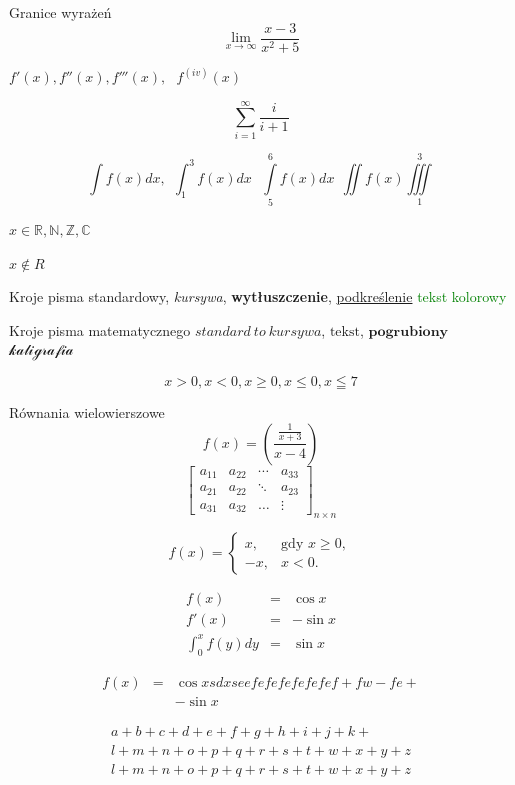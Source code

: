 {Granice wyrażeń
$$
\lim\limits_{x\rightarrow \infty} \frac{x-3}{x^2+5}
$$

$f'(x), f''(x), f'''(x),\ \ \  f^{(iv)}(x)$

$$
\sum_{i=1}^{\infty} \frac{i}{i+1}
$$

$$
\int f(x) dx ,\ \ \int_{1}^{3} f(x) dx \ \ \ \int\limits_5^6 f(x) dx \ \ 
\iint f(x) \iiint\limits_{1}^3
$$

$x\in \mathbb{R, N, Z, C}$ 

$x\notin R$

Kroje pisma standardowy, \textit{kursywa}, \textbf{wytłuszczenie}, \underline{podkreślenie} \textcolor{green}{tekst kolorowy}

Kroje pisma matematycznego $standard\ to\ kursywa $, $\mathrm{tekst}$, $\mathbf{pogrubiony}$  $\mathcal{kaligrafia}$

$$
x>0, x<0, x\geq 0, x\le 0, x\leqq 7
$$

Równania wielowierszowe
\begin{equation*}
	f(x)=\left(\frac{\frac{1}{x+3}}{x-4}\right)
\end{equation*}
$$
\left[
\begin{array}{cccc}
	a_{11} & a_{22} & \cdots & a_{33} \\
	a_{21} & a_{22} & \ddots & a_{23} \\
	a_{31} & a_{32} & \ldots & \vdots
\end{array}
\right]_{n\times n}
$$

\begin{equation*}
	f(x)=\left\{ \begin{array}{cl}
		x, & \text{gdy } x\geq 0,\\
		-x, & x<0.			
	\end{array}
	\right.
\end{equation*}

\begin{eqnarray}
	f(x) & = & \cos x \\
	f'(x) & = & -\sin x \\
	\int_{0}^{x} f(y)dy &
	= & \sin x
\end{eqnarray}


\begin{eqnarray}
	f(x) & = & \cos x  sdxse ef e f ef e fe f e fe f+ fw- fe + \nonumber\\
	 &  & -\sin x 
\end{eqnarray}

\begin{multline}
	a+b+c+d+e+f+g+h+i+j+k+\\
	l+m+n+o+p+q+r+s+t+w+x+y+z\\
	l+m+n+o+p+q+r+s+t+w+x+y+z
\end{multline}



}
